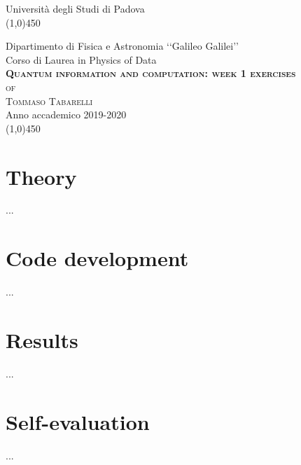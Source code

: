 \documentclass[11pt, a4paper, twoside]{report}
\begin{document}
\begin{titlepage}

\begin{center}
\LARGE{Università degli Studi di Padova}\\
\line(1,0){450}\\
\begin{figure}[H]
\centering

\end{figure}
\vspace{-0.2em}
\Large{Dipartimento di Fisica e Astronomia ‘‘Galileo Galilei’’}\\
\vspace{2em}
\Large{Corso di Laurea in Physics of Data}\\
\vspace{8em}
\Huge{\textsc{\textbf{Quantum information and computation: week 1 exercises}}}\\
\vspace{2em}
\LARGE{\textsc{of}}\\
\vspace{1em}
\huge{\textsc{Tommaso Tabarelli}}\\
\vspace{11em}
\LARGE{Anno accademico 2019-2020}\\
\line(1,0){450}
\end{center}

\end{titlepage}

\begin{abstract}
...
\end{abstract}


\section*{Theory}
...
\section*{Code development}
...
\section*{Results}
...
\section*{Self-evaluation}
...
\end{document}
